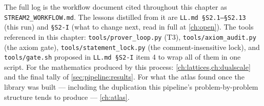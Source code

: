 The full log is the workflow document cited throughout this chapter as
\texttt{STREAM2\allowbreak\_WORKFLOW.md}. The lessons distilled from it are
\texttt{LL.md §S2.1--§S2.13} (this run) and
\texttt{§S2-I} (what to change next, read in full at \cref{ch:open}). The tools
referenced in this chapter:
\texttt{tools/prover\_loop.py} (T3), \texttt{tools/axiom\_audit.py} (the axiom gate),
\texttt{tools/statement\_lock.py} (the comment-insensitive lock), and
\texttt{tools/gate.sh} proposed in \texttt{LL.md §S2-I} item 4 to wrap all of them in one
script. For the mathematics produced by this process: \cref{ch:lattices,ch:dualscale} and
the final tally of \cref{sec:pipeline:results}. For what the atlas found once the library
was built --- including the duplication this pipeline's problem-by-problem structure
tends to produce --- \cref{ch:atlas}.
